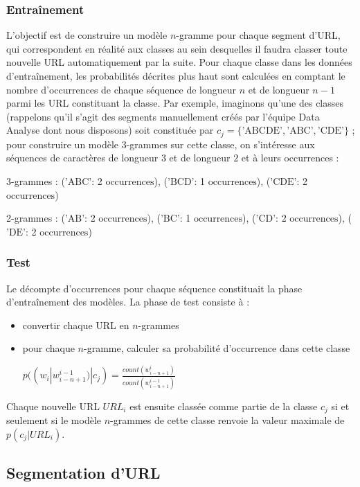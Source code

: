 \documentclass[11pt, a4paper]{article}
\begin{document}
\subsubsection{Entraînement}
L'objectif est de construire un modèle $n$-gramme pour chaque segment d'URL, qui correspondent en réalité aux classes au sein desquelles il faudra classer toute nouvelle URL automatiquement par la suite. Pour chaque classe dans les données d'entraînement, les probabilités décrites plus haut sont calculées en comptant le nombre d'occurrences de chaque séquence de longueur $n$ et de longueur $n-1$ parmi les URL constituant la classe. Par exemple, imaginons qu'une des classes (rappelons qu'il s'agit des segments manuellement créés par l'équipe Data Analyse dont nous disposons) soit constituée par $c_j = \{\text{'ABCDE'}, \text{'ABC'}, \text{'CDE'}\}$ ; pour construire un modèle $3$-grammes sur cette classe, on s'intéresse aux séquences de caractères de longueur $3$ et de longueur $2$ et à leurs occurrences : 

3-grammes : ($\text{'ABC'}$: 2 $\text{occurrences}$), ($\text{'BCD'}$: 1 $\text{occurrences}$), ($\text{'CDE'}$: 2 $\text{occurrences}$)

2-grammes : ($\text{'AB'}$: 2 $\text{occurrences}$), ($\text{'BC'}$: 1 $\text{occurrences}$), ($\text{'CD'}$: 2 $\text{occurrences}$), ($\text{'DE'}$: 2 $\text{occurrences}$)

\subsubsection{Test}

Le décompte d'occurrences pour chaque séquence constituait la phase d'entraînement des modèles. La phase de test consiste à :

\begin{itemize}
	\item convertir chaque URL en $n$-grammes
	\item pour chaque $n$-gramme, calculer sa probabilité d'occurrence dans cette classe
	
	$p((w_i|w_{i-n+1}^{i-1})|c_j) = \frac{count(w_{i-n+1}^{i})}{count(w_{i-n+1}^{i-1})}$
\end{itemize}

Chaque nouvelle URL $URL_i$ est ensuite classée comme partie de la classe $c_j$ si et seulement si le modèle $n$-grammes de cette classe renvoie la valeur maximale de $p(c_j|URL_i)$.

\subsection{Segmentation d'URL}
\end{document}
